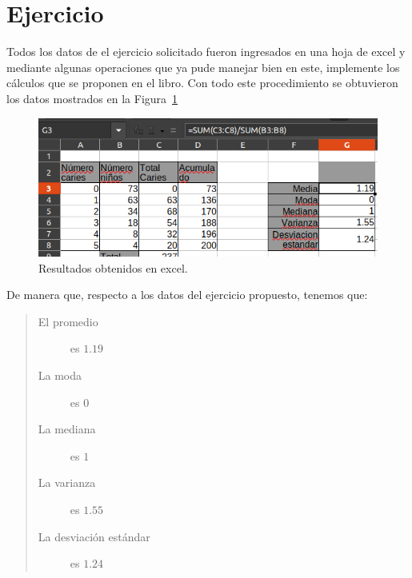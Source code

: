 \documentclass[11pt]{article}
\begin{document}
\newpage
\section*{Ejercicio}

	\par Todos los datos de el ejercicio solicitado fueron ingresados en una hoja de excel y mediante algunas operaciones que ya pude manejar bien en este, implemente los cálculos que se proponen en el libro. Con todo este procedimiento se obtuvieron los datos mostrados en la Figura~\ref{fig: excel}
	
	\begin{figure}[h]
		\centering
		\includegraphics[width=\textwidth]{u3-a3-1.png}
		\caption{Resultados obtenidos en excel.}
		\label{fig: excel}
	\end{figure}
	
	\par De manera que, respecto a los datos del ejercicio propuesto, tenemos que:
	\begin{quote}
		\begin{description}
			\item [El promedio] es $1.19$
			\item [La moda] es $0$
			\item [La mediana] es $1$
			\item [La varianza] es $1.55$
			\item [La desviación estándar] es $1.24$ 
		\end{description}
	\end{quote}
	
\end{document}

